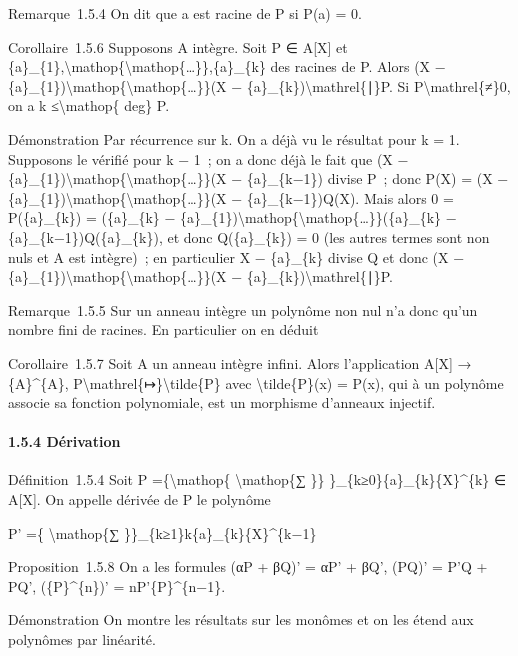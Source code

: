 \documentclass[]{article}
\begin{document}
Remarque~1.5.4 On dit que a est racine de P si P(a) = 0.

Corollaire~1.5.6 Supposons A intègre. Soit P ∈ A{[}X{]} et
\{a\}\_\{1\},\textbackslash{}mathop\{\textbackslash{}mathop\{\ldots{}\}\},\{a\}\_\{k\}
des racines de P. Alors (X −
\{a\}\_\{1\})\textbackslash{}mathop\{\textbackslash{}mathop\{\ldots{}\}\}(X
− \{a\}\_\{k\})\textbackslash{}mathrel\{∣\}P. Si
P\textbackslash{}mathrel\{≠\}0, on a k ≤\textbackslash{}mathop\{ deg\}
P.

Démonstration Par récurrence sur k. On a déjà vu le résultat pour k = 1.
Supposons le vérifié pour k − 1~; on a donc déjà le fait que (X −
\{a\}\_\{1\})\textbackslash{}mathop\{\textbackslash{}mathop\{\ldots{}\}\}(X
− \{a\}\_\{k−1\}) divise P~; donc P(X) = (X −
\{a\}\_\{1\})\textbackslash{}mathop\{\textbackslash{}mathop\{\ldots{}\}\}(X
− \{a\}\_\{k−1\})Q(X). Mais alors 0 = P(\{a\}\_\{k\}) = (\{a\}\_\{k\} −
\{a\}\_\{1\})\textbackslash{}mathop\{\textbackslash{}mathop\{\ldots{}\}\}(\{a\}\_\{k\}
− \{a\}\_\{k−1\})Q(\{a\}\_\{k\}), et donc Q(\{a\}\_\{k\}) = 0 (les
autres termes sont non nuls et A est intègre)~; en particulier X −
\{a\}\_\{k\} divise Q et donc (X −
\{a\}\_\{1\})\textbackslash{}mathop\{\textbackslash{}mathop\{\ldots{}\}\}(X
− \{a\}\_\{k\})\textbackslash{}mathrel\{∣\}P.

Remarque~1.5.5 Sur un anneau intègre un polynôme non nul n'a donc qu'un
nombre fini de racines. En particulier on en déduit

Corollaire~1.5.7 Soit A un anneau intègre infini. Alors l'application
A{[}X{]} → \{A\}\^{}\{A\},
P\textbackslash{}mathrel\{↦\}\textbackslash{}tilde\{P\} avec
\textbackslash{}tilde\{P\}(x) = P(x), qui à un polynôme associe sa
fonction polynomiale, est un morphisme d'anneaux injectif.

\paragraph{1.5.4 Dérivation}

Définition~1.5.4 Soit P =\{\textbackslash{}mathop\{
\textbackslash{}mathop\{∑ \}\} \}\_\{k≥0\}\{a\}\_\{k\}\{X\}\^{}\{k\} ∈
A{[}X{]}. On appelle dérivée de P le polynôme

P' =\{ \textbackslash{}mathop\{∑
\}\}\_\{k≥1\}k\{a\}\_\{k\}\{X\}\^{}\{k−1\}

Proposition~1.5.8 On a les formules (αP + βQ)' = αP' + βQ', (PQ)' = P'Q
+ PQ', (\{P\}\^{}\{n\})' = nP'\{P\}\^{}\{n−1\}.

Démonstration On montre les résultats sur les monômes et on les étend
aux polynômes par linéarité.
\end{document}
